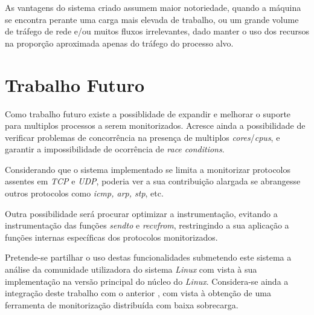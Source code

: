 As vantagens do sistema criado assumem maior notoriedade, quando a máquina se encontra perante uma carga mais elevada de trabalho, ou um grande volume de tráfego de rede e/ou muitos fluxos irrelevantes, dado manter o uso dos recursos na proporção aproximada apenas do tráfego do processo alvo.

\section{Trabalho Futuro}
\label{sec:future_work}
Como trabalho futuro existe a possiblidade de expandir e melhorar o suporte para multiplos processos a serem monitorizados.
Acresce ainda a possibilidade de verificar problemas de concorrência na presença de multiplos \textit{cores}/\textit{cpus}, e garantir a impossibilidade de ocorrência de \textit{race conditions}.

Considerando que o sistema implementado se limita a monitorizar protocolos assentes em \textit{TCP} e \textit{UDP}, poderia ver a sua contribuição alargada se abrangesse outros protocolos como \textit{icmp, arp, stp}, etc.

Outra possibilidade será procurar optimizar a instrumentação, evitando a instrumentação das funções \textit{sendto} e \textit{recvfrom}, restringindo a sua aplicação a funções internas específicas dos protocolos monitorizados.

Pretende-se partilhar o uso destas funcionalidades submetendo este sistema a análise da comunidade utilizadora do sistema \textit{Linux} com vista à sua implementação na versão principal do núcleo do \textit{Linux}.
Considera-se ainda a integração deste trabalho com o anterior \cite{duarte10,Farruca:2009}, com vista à obtenção de uma ferramenta de monitorização distribuída com baixa sobrecarga.
